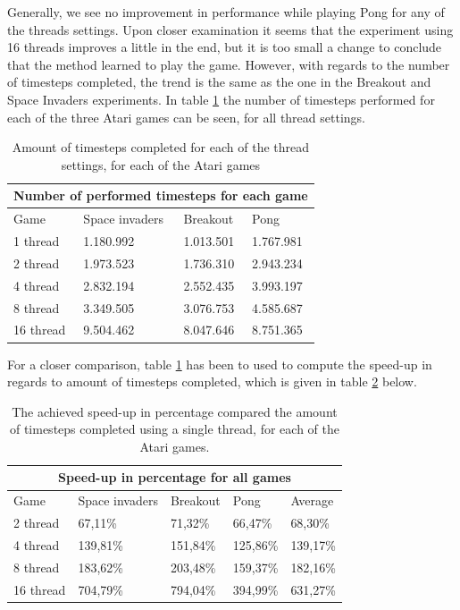 \documentclass[11pt]{article}
\begin{document}
Generally, we see no improvement in performance while playing Pong for any of the threads settings.
Upon closer examination it seems that the experiment using 16 threads improves a little
in the end, but it is too small a change to conclude that the method learned to play the 
game.
However, with regards to the number of timesteps completed,
the trend is the same as the one in the Breakout and Space Invaders
experiments.
In table \ref{table:compare_timesteps} the number of timesteps performed
for each of the three Atari games can be seen, for all thread settings.
\begin{table}[H]
\centering
\begin{tabular}{ |p{3cm}||p{3cm}|p{3cm}|p{3cm}|  }
 \hline
 \multicolumn{4}{|c|}{Number of performed timesteps for each game} \\
 \hline
      Game & Space invaders  & Breakout & Pong\\
 \hline
 1 thread   & 1.180.992    & 1.013.501&   1.767.981\\
 \hline
 2 thread&   1.973.523  & 1.736.310   & 2.943.234\\
 \hline
 4 thread& 2.832.194 & 2.552.435&  3.993.197\\
 \hline
 8 thread   & 3.349.505 & 3.076.753 &  4.585.687\\
 \hline
 16 thread&   9.504.462  & 8.047.646 & 8.751.365\\
 \hline
\end{tabular}
\caption{Amount of timesteps completed for each of the thread settings, for each of the Atari games}
\label{table:compare_timesteps}
\end{table}
For a closer comparison, table \ref{table:compare_timesteps} has been to used
to compute the speed-up in regards to amount of timesteps completed,
which is given in table \ref{tab:speed-up} below.

\begin{table}[H]
\centering
\begin{tabular}{ |p{2.5cm}||p{2.5cm}|p{2.5cm}|p{2.5cm}|p{2.5cm}|  }
 \hline
 \multicolumn{5}{|c|}{Speed-up in percentage for all games} \\
 \hline
      Game & Space invaders  & Breakout & Pong & Average\\
 \hline
 2 thread&   67,11\%  & 71,32\%   & 66,47\% & 68,30\%\\
 \hline
 4 thread& 139,81\% & 151,84\% &  125,86\% & 139,17\%\\
 \hline
 8 thread   & 183,62\% & 203,48\% &  159,37\% & 182,16\%\\
 \hline
 16 thread&   704,79\%  & 794,04\% & 394,99\% & 631,27\%\\
 \hline
\end{tabular}
\caption{The achieved speed-up in percentage compared the amount of timesteps completed using
a single thread, for each of the Atari games.}
\label{tab:speed-up}
\end{table}
\end{document}
